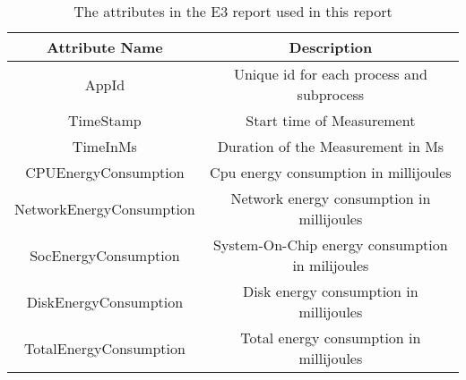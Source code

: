 \begin{table}[ht]
    \centering
    \begin{tabular}{||c|c||}
    \hline
    \textbf{Attribute Name}  & \textbf{Description}                            \\ [0.5ex] \hline\hline
    AppId                    & Unique id for each process and subprocess       \\ \hline
    TimeStamp                & Start time of Measurement                       \\ \hline
    TimeInMs                 & Duration of the Measurement in Ms               \\ \hline
    CPUEnergyConsumption     & Cpu energy consumption in millijoules           \\ \hline
    NetworkEnergyConsumption & Network energy consumption in millijoules       \\ \hline
    SocEnergyConsumption     & System-On-Chip energy consumption in milijoules \\ \hline
    DiskEnergyConsumption    & Disk energy consumption in millijoules          \\ \hline
    TotalEnergyConsumption   & Total energy consumption in millijoules         \\ \hline
    \end{tabular}
    \caption{The attributes in the E3 report used in this report}
    \label{tab:E3_attr_Table}
    \end{table}